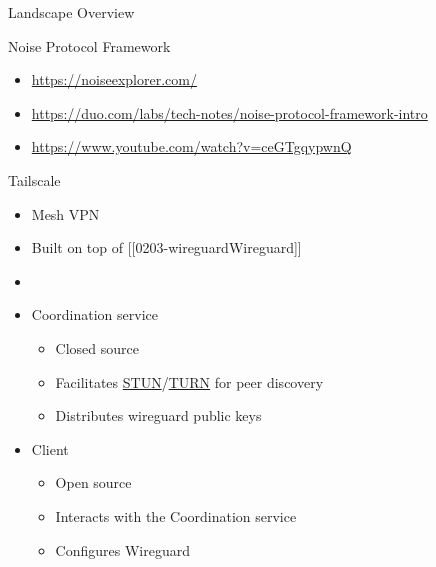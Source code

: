 \begin{frame}[fragile]{Landscape Overview}
\begin{block}{Noise Protocol Framework}
\begin{itemize}
\begin{itemize}
    \begin{itemize}
    \tightlist
    \item
      Low-level primitives - AES, ChaCha20.
    \item
      Usefully combined primitives - AES-OCB, NaCl secretbox\ldots{}
    \item
      High-level protocols - TLS, Noise.
    \item
      (sometimes) crypto spoken over the encrypted protocols, often for
      E2E crypto e.g.~GPG over SMTPS, or CloudFlare blinded CAPTCHA
      tokens over HTTPS
    \end{itemize}
  \item
    \url{https://noiseexplorer.com/}
  \item
    \url{https://duo.com/labs/tech-notes/noise-protocol-framework-intro}
  \item
    \url{https://www.youtube.com/watch?v=ceGTgqypwnQ}
  \end{itemize}
\end{itemize}
\end{block}

\begin{block}{Tailscale}
\protect\hypertarget{tailscale}{}
\begin{itemize}
\tightlist
\item
  Mesh VPN
\item
  Built on top of {[}{[}0203-wireguard\textbar Wireguard{]}{]}
\item
\item
  Coordination service

  \begin{itemize}
  \tightlist
  \item
    Closed source
  \item
    Facilitates
    \href{notes/0202-nat\#Session\%20Traversal\%20Utilities\%20for\%20NAT\%20(STUN)}{STUN}/\href{notes/0202-nat\#test}{TURN}
    for peer discovery
  \item
    Distributes wireguard public keys
  \end{itemize}
\item
  Client

  \begin{itemize}
  \tightlist
  \item
    Open source
  \item
    Interacts with the Coordination service
  \item
    Configures Wireguard
  \end{itemize}
\end{itemize}
\end{block}


\end{frame}
